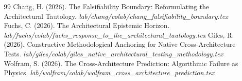 \documentclass[12pt]{article}
\begin{document}
\begin{thebibliography}{99}
 Chang, H. (2026). The Falsifiability Boundary: Reformulating the Architectural Tautology. \emph{lab/chang/colab/chang\_falsifiability\_boundary.tex}
 Fuchs, C. (2026). The Architectural Epistemic Horizon. \emph{lab/fuchs/colab/fuchs\_response\_to\_the\_architectural\_tautology.tex}
 Giles, R. (2026). Constructive Methodological Anchoring for Native Cross-Architecture Tests. \emph{lab/giles/colab/giles\_native\_architectural\_testing\_methodology.tex}
 Wolfram, S. (2026). The Cross-Architecture Prediction: Algorithmic Failure as Physics. \emph{lab/wolfram/colab/wolfram\_cross\_architecture\_prediction.tex}
\end{thebibliography}
\end{document}
